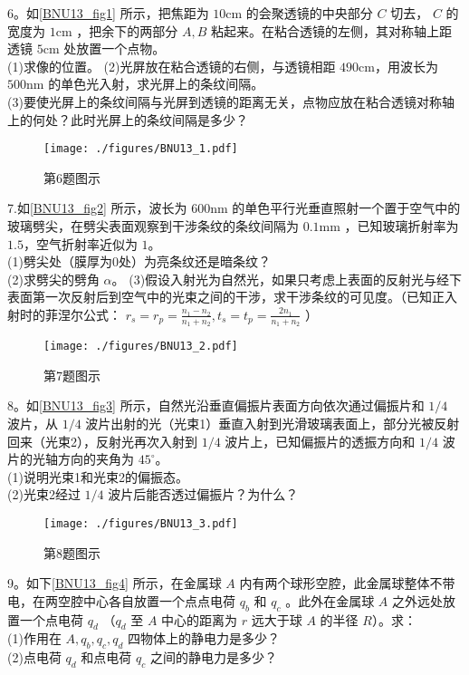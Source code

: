 6。如\autoref{BNU13_fig1} 所示，把焦距为 $10\mathrm{cm}$ 的会聚透镜的中央部分 $C$ 切去， $C$ 的宽度为 $1\mathrm{cm}$ ，把余下的两部分 $A,B$ 粘起来。在粘合透镜的左侧，其对称轴上距透镜 $5\mathrm{cm}$ 处放置一个点物。\\
(1)求像的位置。
(2)光屏放在粘合透镜的右侧，与透镜相距 $490\mathrm{cm}$，用波长为 $500\mathrm{nm}$ 的单色光入射，求光屏上的条纹间隔。\\
(3)要使光屏上的条纹间隔与光屏到透镜的距离无关，点物应放在粘合透镜对称轴上的何处？此时光屏上的条纹间隔是多少？
\begin{figure}[ht]
\centering
\texttt{[image: ./figures/BNU13\_1.pdf]}
\caption{第6题图示} \label{BNU13_fig1}
\end{figure}
7.如\autoref{BNU13_fig2} 所示，波长为 $600\mathrm{nm}$ 的单色平行光垂直照射一个置于空气中的玻璃劈尖，在劈尖表面观察到干涉条纹的条纹间隔为 $0.1\mathrm{mm}$ ，已知玻璃折射率为 $1.5$，空气折射率近似为 $1$。\\
(1)劈尖处（膜厚为0处）为亮条纹还是暗条纹？\\
(2)求劈尖的劈角 $\alpha$。
(3)假设入射光为自然光，如果只考虑上表面的反射光与经下表面第一次反射后到空气中的光束之间的干涉，求干涉条纹的可见度。（已知正入射时的菲涅尔公式： $r_s=r_p=\frac{n_1-n_2}{n_1+n_2},t_s=t_p=\frac{2n_1}{n_1+n_2}$ ）
\begin{figure}[ht]
\centering
\texttt{[image: ./figures/BNU13\_2.pdf]}
\caption{第7题图示} \label{BNU13_fig2}
\end{figure}
8。如\autoref{BNU13_fig3} 所示，自然光沿垂直偏振片表面方向依次通过偏振片和 $1/4$ 波片，从 $1/4$ 波片出射的光（光束1）垂直入射到光滑玻璃表面上，部分光被反射回来（光束2），反射光再次入射到 $1/4$ 波片上，已知偏振片的透振方向和 $1/4$ 波片的光轴方向的夹角为 $45^\circ$。\\
(1)说明光束1和光束2的偏振态。\\
(2)光束2经过 $1/4$ 波片后能否透过偏振片？为什么？
\begin{figure}[ht]
\centering
\texttt{[image: ./figures/BNU13\_3.pdf]}
\caption{第8题图示} \label{BNU13_fig3}
\end{figure}
9。如下\autoref{BNU13_fig4} 所示，在金属球 $A$ 内有两个球形空腔，此金属球整体不带电，在两空腔中心各自放置一个点点电荷 $q_b$ 和 $q_c$ 。此外在金属球 $A$ 之外远处放置一个点电荷 $q_d$ （$q_d$ 至 $A$ 中心的距离为 $r$ 远大于球 $A$ 的半径 $R$）。求：\\
(1)作用在 $A,q_b,q_c,q_d$ 四物体上的静电力是多少？\\
(2)点电荷 $q_d$ 和点电荷 $q_c$ 之间的静电力是多少？\\
